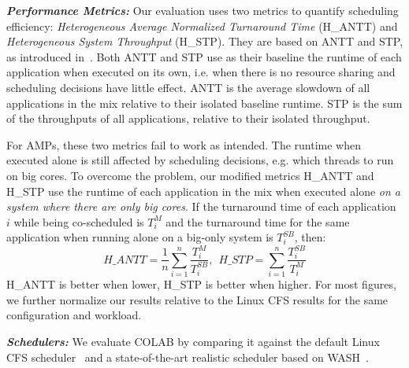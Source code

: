 
\textbf{\textit{Performance Metrics:}} Our evaluation uses two metrics to quantify scheduling efficiency: {\it Heterogeneous Average Normalized Turnaround Time} (H\_ANTT) and {\it Heterogeneous System Throughput} (H\_STP). They are based on ANTT and STP, as introduced in~\cite{eyerman2008system}. Both ANTT and STP use as their baseline the runtime of each application when executed on its own, i.e. when there is no resource sharing and scheduling decisions have little effect. ANTT is the average slowdown of all applications in the mix relative to their isolated baseline runtime. STP is the sum of the throughputs of all applications, relative to their isolated throughput.

For AMPs, these two metrics fail to work as intended. The runtime when executed alone is still affected by scheduling decisions, e.g. which threads to run on big cores. To overcome the problem, our modified metrics H\_ANTT and H\_STP use the runtime of each application in the mix when executed alone \emph{on a system where there are only big cores}. If the turnaround time of each application $i$ while being co-scheduled is $T^{M}_i$ and the turnaround time for the same application when running alone on a big-only system is $T^{SB}_i$, then:
$$ H\_ANTT = \frac{1}{n}\sum^{n}_{i=1}\frac{T^{M}_i}{T^{SB}_i}
,\ \ H\_STP = \sum^{n}_{i=1}\frac{T^{SB}_i}{T^{M}_i}$$
H\_ANTT is better when lower, H\_STP is better when higher. For most figures, we further normalize our results relative to the Linux CFS results for the same configuration and workload.

\textbf{\textit{Schedulers:}}
We evaluate COLAB by comparing it against the default Linux CFS scheduler~\cite{molnar2007cfs} and a state-of-the-art realistic scheduler based on WASH~\cite{jibaja2016portable}. 

